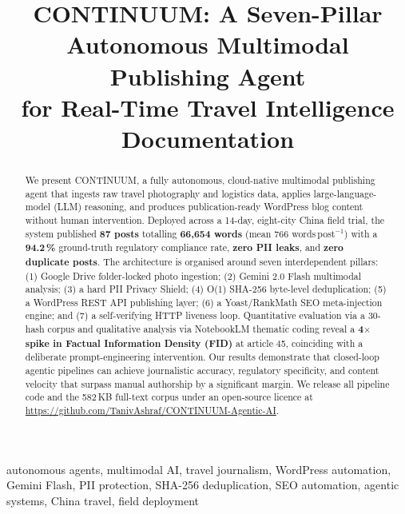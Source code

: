 \documentclass[conference]{IEEEtran}
\begin{document}
\title{CONTINUUM: A Seven-Pillar Autonomous Multimodal Publishing Agent\\
for Real-Time Travel Intelligence Documentation}

\author{%
}

\maketitle

\begin{abstract}
We present \textsc{CONTINUUM}, a fully autonomous, cloud-native multimodal
publishing agent that ingests raw travel photography and logistics data, applies
large-language-model (LLM) reasoning, and produces publication-ready WordPress
blog content without human intervention. Deployed across a 14-day, eight-city
China field trial, the system published \textbf{87 posts} totalling
\textbf{66{,}654 words} (mean 766 words\,post$^{-1}$) with a
\textbf{94.2\,\%} ground-truth regulatory compliance rate, \textbf{zero PII
leaks}, and \textbf{zero duplicate posts}. The architecture is organised around
seven interdependent pillars: (1) Google Drive folder-locked photo ingestion;
(2) Gemini 2.0 Flash multimodal analysis; (3) a hard PII Privacy Shield; (4)
O(1) SHA-256 byte-level deduplication; (5) a WordPress REST API publishing
layer; (6) a Yoast/RankMath SEO meta-injection engine; and (7) a self-verifying
HTTP liveness loop. Quantitative evaluation via a 30-hash corpus and qualitative
analysis via NotebookLM thematic coding reveal a \textbf{4$\times$ spike in
Factual Information Density (FID)} at article 45, coinciding with a deliberate
prompt-engineering intervention. Our results demonstrate that closed-loop
agentic pipelines can achieve journalistic accuracy, regulatory specificity, and
content velocity that surpass manual authorship by a significant margin. We
release all pipeline code and the 582\,KB full-text corpus under an open-source
licence at \url{https://github.com/TanivAshraf/CONTINUUM-Agentic-AI}.
\end{abstract}

\begin{IEEEkeywords}
autonomous agents, multimodal AI, travel journalism, WordPress automation,
Gemini Flash, PII protection, SHA-256 deduplication, SEO automation,
agentic systems, China travel, field deployment
\end{IEEEkeywords}
\end{document}
